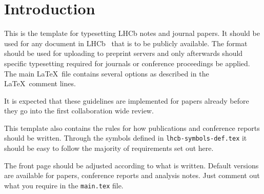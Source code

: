 
\section{Introduction}
\label{sec:Introduction}

This is the template for typesetting LHCb notes and journal papers.
It should be used for any document in LHCb~\cite{Alves:2008zz} that is to be
publicly available. The format should be used for uploading to
preprint servers and only afterwards should specific typesetting
required for journals or conference proceedings be applied. The main
\LaTeX\ file contains several options as described in the \LaTeX\ comment
lines.

It is expected that these guidelines are implemented for papers already
before they go into the first collaboration wide review. 

This template also contains the rules for how publications and
conference reports should be written. Through the symbols defined in
\texttt{lhcb-symbols-def.tex} it should be easy to follow the majority
of requirements set out here.

The front page should be adjusted according to what is
written. Default versions are available for papers, conference reports
and analysis notes. Just comment out what you require in the
\texttt{main.tex} file.
